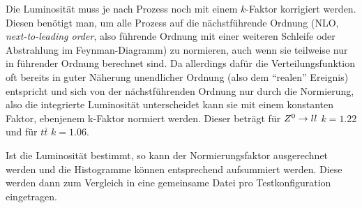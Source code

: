 Die Luminosität muss je nach Prozess noch mit einem $k$-Faktor korrigiert
werden. Diesen benötigt man, um alle Prozess auf die nächstführende Ordnung
(NLO, \emph{next-to-leading order}, also führende Ordnung mit einer weiteren
Schleife oder Abstrahlung im Feynman-Diagramm) zu normieren, auch wenn sie
teilweise nur in führender Ordnung berechnet sind. Da allerdings dafür die
Verteilungsfunktion oft bereits in guter Näherung unendlicher Ordnung (also dem
"`realen"' Ereignis) entspricht und sich von der nächstführenden Ordnung nur
durch die Normierung, also die integrierte Luminosität unterscheidet kann sie
mit einem konstanten Faktor, ebenjenem k-Faktor normiert werden. Dieser beträgt
für $Z^0\to ll$ $k = 1.22$ und für $t\bar{t}$ $k=1.06$.\cite{10tev}

Ist die Luminosität bestimmt, so kann der Normierungsfaktor ausgerechnet werden
und die Histogramme können entsprechend aufsummiert werden. Diese werden dann
zum Vergleich in eine gemeinsame Datei pro Testkonfiguration eingetragen.
